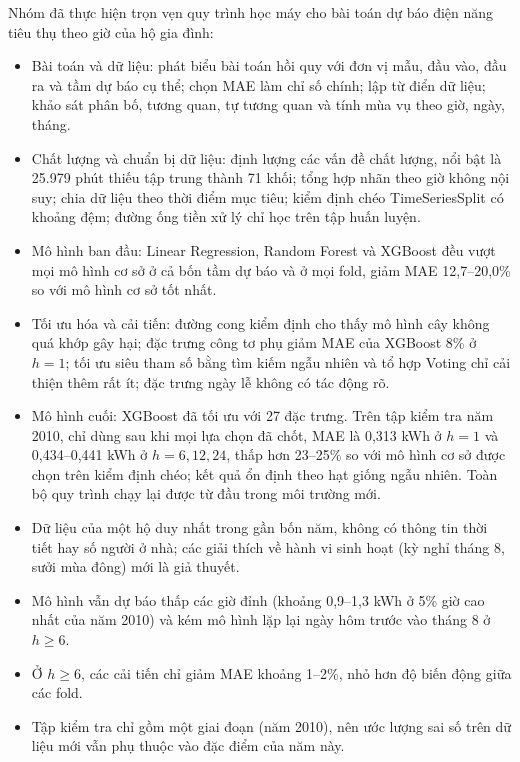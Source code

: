 \label{chap:conclusion}

Nhóm đã thực hiện trọn vẹn quy trình học máy cho bài toán dự báo điện năng tiêu thụ theo giờ của hộ gia đình:
\begin{itemize}
    \item Bài toán và dữ liệu: phát biểu bài toán hồi quy với đơn vị mẫu, đầu vào, đầu ra và tầm dự báo cụ thể; chọn MAE làm chỉ số chính; lập từ điển dữ liệu; khảo sát phân bố, tương quan, tự tương quan và tính mùa vụ theo giờ, ngày, tháng.
    \item Chất lượng và chuẩn bị dữ liệu: định lượng các vấn đề chất lượng, nổi bật là 25.979 phút thiếu tập trung thành 71 khối; tổng hợp nhãn theo giờ không nội suy; chia dữ liệu theo thời điểm mục tiêu; kiểm định chéo TimeSeriesSplit có khoảng đệm; đường ống tiền xử lý chỉ học trên tập huấn luyện.
    \item Mô hình ban đầu: Linear Regression, Random Forest và XGBoost đều vượt mọi mô hình cơ sở ở cả bốn tầm dự báo và ở mọi fold, giảm MAE 12,7--20,0\% so với mô hình cơ sở tốt nhất.
    \item Tối ưu hóa và cải tiến: đường cong kiểm định cho thấy mô hình cây không quá khớp gây hại; đặc trưng công tơ phụ giảm MAE của XGBoost 8\% ở $h = 1$; tối ưu siêu tham số bằng tìm kiếm ngẫu nhiên và tổ hợp Voting chỉ cải thiện thêm rất ít; đặc trưng ngày lễ không có tác động rõ.
    \item Mô hình cuối: XGBoost đã tối ưu với 27 đặc trưng. Trên tập kiểm tra năm 2010, chỉ dùng sau khi mọi lựa chọn đã chốt, MAE là 0,313 kWh ở $h = 1$ và 0,434--0,441 kWh ở $h = 6, 12, 24$, thấp hơn 23--25\% so với mô hình cơ sở được chọn trên kiểm định chéo; kết quả ổn định theo hạt giống ngẫu nhiên. Toàn bộ quy trình chạy lại được từ đầu trong môi trường mới.
\end{itemize}

\begin{itemize}
    \item Dữ liệu của một hộ duy nhất trong gần bốn năm, không có thông tin thời tiết hay số người ở nhà; các giải thích về hành vi sinh hoạt (kỳ nghỉ tháng 8, sưởi mùa đông) mới là giả thuyết.
    \item Mô hình vẫn dự báo thấp các giờ đỉnh (khoảng 0,9--1,3 kWh ở 5\% giờ cao nhất của năm 2010) và kém mô hình lặp lại ngày hôm trước vào tháng 8 ở $h \ge 6$.
    \item Ở $h \ge 6$, các cải tiến chỉ giảm MAE khoảng 1--2\%, nhỏ hơn độ biến động giữa các fold.
    \item Tập kiểm tra chỉ gồm một giai đoạn (năm 2010), nên ước lượng sai số trên dữ liệu mới vẫn phụ thuộc vào đặc điểm của năm này.
\end{itemize}


